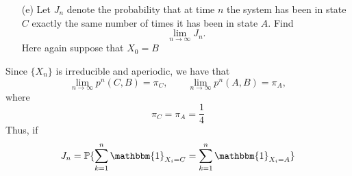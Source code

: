 \documentclass[11pt]{article}
\newcommand{\bbP}{\mathbb{P}}
\begin{document}
\begin{problem}
\begin{enumerate}
\begin{solution}
\end{solution}
    \item[(e)] Let \( J_n \) denote the probability that at time \( n \) the system has been in state \( C \) exactly the same number of times it has been in state \( A \). Find
    \[
    \lim_{n \to \infty} J_n.
    \] Here again suppose that $X_0 = B$
\end{enumerate}
\begin{solution}
    Since $\{X_n\}$ is irreducible and aperiodic, we have that 
    \[\lim_{n\to \infty}p^n(C,B) = \pi_C, \qquad \lim_{n\to \infty}p^n(A,B) = \pi_A,\] where 
    \[\pi_C = \pi_A = \frac{1}{4}\] Thus, if 
    \[J_n = \bbP\{\sum_{k=1}^n \mathbbm{1}_{X_i = C}=  \sum_{k=1}^n \mathbbm{1}_{X_i = A}\}\]
\end{solution}
\end{problem}

\newpage
\end{document}
